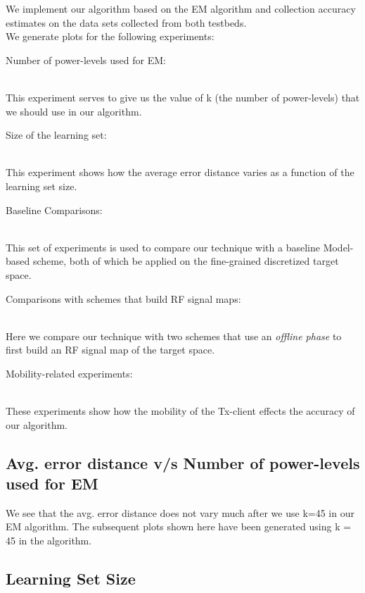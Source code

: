 \documentclass{Localization-PaperWriteupDraft}
\begin{document}
We implement our algorithm based on the EM algorithm and collection
accuracy estimates on the data sets collected from both testbeds.\\ 

We generate plots for the following experiments:

\begin{enumerate}
{\bf \item Number of power-levels used for EM: }\\
This experiment serves to give us the value of k (the number of
power-levels) that we should use in our algorithm.

{\bf \item Size of the learning set:}\\
This experiment shows how the average error distance varies as a
function of the learning set size.

{\bf \item Baseline Comparisons:}\\
This set of experiments is used to compare our technique with a baseline
Model-based scheme, both of which be applied on the fine-grained
discretized target space.

{\bf \item Comparisons with schemes that build RF signal maps:}\\
Here we compare our technique with two schemes that use an {\it offline
phase} to first build an RF signal map of the target space. 

{\bf \item Mobility-related experiments:}\\
These experiments show how the mobility of the Tx-client effects the
accuracy of our algorithm.

\end{enumerate}

\subsection{Avg. error distance v/s Number of power-levels used for EM}
\label{subsec:avgerrordistancevsnumberofpowerlevelsusedforEM}



We see that the avg. error distance does not vary much after we use k=45
in our EM algorithm. The subsequent plots shown here have been generated
using k = 45 in the algorithm. 

\subsection{Learning Set Size}
\label{subsec:learningsetsize}
\end{document}
